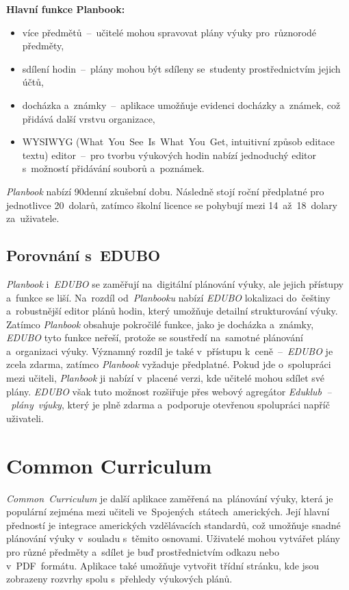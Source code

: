 \documentclass[male,czech,api_bc]{kitheses}
\begin{document}
\textbf{Hlavní funkce Planbook:}
\begin{itemize}
	\item více předmětů~--~učitelé mohou spravovat plány výuky pro~různorodé předměty,
	\item sdílení hodin~--~plány mohou být sdíleny se~studenty prostřednictvím jejich účtů,
	\item docházka a~známky~--~aplikace umožňuje evidenci docházky a~známek, což přidává další vrstvu organizace,
	\item WYSIWYG (What~You~See~Is~What~You~Get, intuitivní způsob editace textu) editor~--~pro tvorbu výukových hodin nabízí jednoduchý editor s~možností přidávání souborů a~poznámek.
\end{itemize}

\textit{Planbook} nabízí 90denní zkušební dobu. Následně stojí roční předplatné pro jednotlivce 20~dolarů, zatímco školní licence se pohybují mezi 14~až~18~dolary za~uživatele.

\subsection{Porovnání s~EDUBO}  
\textit{Planbook} i~\textit{EDUBO} se zaměřují na~digitální plánování výuky, ale jejich přístupy a~funkce se liší. Na~rozdíl od~\textit{Planbooku} nabízí \textit{EDUBO} lokalizaci do~češtiny a~robustnější editor plánů hodin, který umožňuje detailní strukturování výuky. Zatímco \textit{Planbook} obsahuje pokročilé funkce, jako je docházka a~známky, \textit{EDUBO} tyto funkce neřeší, protože se soustředí na~samotné plánování a~organizaci výuky. Významný rozdíl je také v~přístupu k~ceně~--~\textit{EDUBO} je zcela zdarma, zatímco \textit{Planbook} vyžaduje předplatné. Pokud jde o~spolupráci mezi učiteli, \textit{Planbook} ji nabízí v~placené verzi, kde učitelé mohou sdílet své plány. \textit{EDUBO} však tuto možnost rozšiřuje přes webový agregátor \textit{Eduklub~--~plány~výuky}, který je plně zdarma a~podporuje otevřenou spolupráci napříč uživateli.

\section{Common Curriculum}

\textit{Common~Curriculum} je další aplikace zaměřená na~plánování výuky, která je populární zejména mezi učiteli ve~Spojených~státech~amerických. Její hlavní předností je integrace amerických vzdělávacích standardů, což umožňuje snadné plánování výuky v~souladu s~těmito osnovami. Uživatelé mohou vytvářet plány pro různé předměty a~sdílet je buď prostřednictvím odkazu nebo v~PDF~formátu. Aplikace také umožňuje vytvořit třídní stránku, kde jsou zobrazeny rozvrhy spolu s~přehledy výukových plánů.
\end{document}
